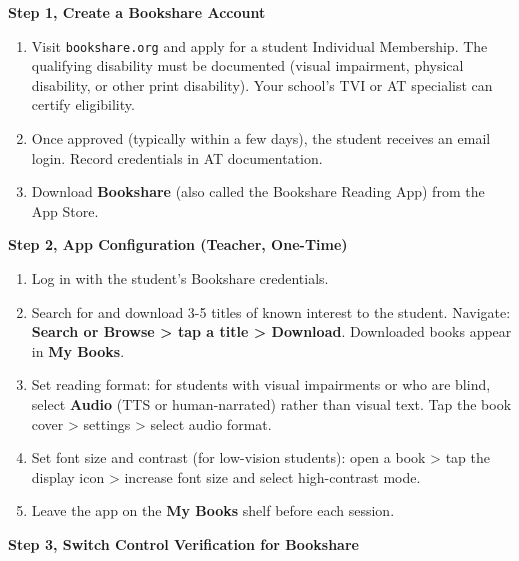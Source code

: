 \documentclass[justified,openright]{tufte-book}
\begin{document}
\textbf{Step 1, Create a Bookshare Account}

\begin{enumerate}
\item
  Visit \texttt{bookshare.org} and apply for a student Individual
  Membership. The qualifying disability must be documented (visual
  impairment, physical disability, or other print disability). Your
  school's TVI or AT specialist can certify eligibility.
\item
  Once approved (typically within a few days), the student receives an
  email login. Record credentials in AT documentation.
\item
  Download \textbf{Bookshare} (also called the Bookshare Reading App)
  from the App Store.
\end{enumerate}

\textbf{Step 2, App Configuration (Teacher, One-Time)}

\begin{enumerate}
\item
  Log in with the student's Bookshare credentials.
\item
  Search for and download 3-5 titles of known interest to the student.
  Navigate: \textbf{Search or Browse \textgreater{} tap a title
  \textgreater{} Download}. Downloaded books appear in
  \textbf{My Books}.
\item
  Set reading format: for students with visual impairments or who are
  blind, select \textbf{Audio} (TTS or human-narrated) rather than
  visual text. Tap the book cover \textgreater{} settings \textgreater{}
  select audio format.
\item
  Set font size and contrast (for low-vision students): open a book
  \textgreater{} tap the display icon \textgreater{} increase font size
  and select high-contrast mode.
\item
  Leave the app on the \textbf{My Books} shelf before each session.
\end{enumerate}


\textbf{Step 3, Switch Control Verification for Bookshare}
\end{document}
